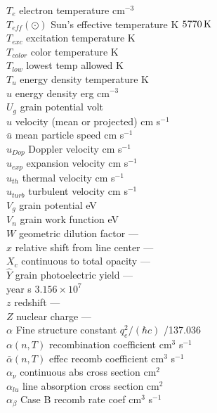 \begin{tabbing}
$T_e$ \>  electron temperature \>
cm$^{-3}$\\
$T_{eff}(\odot)$ \>  Sun's effective temperature \>  K \>  $5770 {\rm\thinspace K}$\\
$T_{exc}$ \>  excitation
temperature \>  K \> \\
$T_{color}$ \>  color temperature \>  K\\
$T_{low}$ \>  lowest temp allowed \>  K \>   \TEMPLIMITLOW\\
$T_{u}$ \>  energy density temperature \>  K\\
$u$ \>  energy density \>  erg cm$^{-3}$\\
$U_g$ \>  grain
potential \>  volt\\
$u$ \>  velocity (mean or projected) \>  cm s$^{-1}$\\
$\bar u$ \>  mean particle speed \>  cm s$^{-1}$\\
$u_{Dop}$ \>  Doppler velocity \>  cm s$^{-1}$\\
$u_{exp}$ \>  expansion
velocity \>  cm s$^{-1}$\\
$u_{th}$ \>  thermal velocity \>  cm s$^{-1}$\\
$u_{turb}$ \>  turbulent velocity \>  cm s$^{-1}$\\
$V_g$ \>  grain potential \>  eV\\
$V_n$ \>  grain work function \>  eV\\
$W$ \>  geometric dilution factor \> ---\\
$x$ \>  relative shift from line center \> ---\\
$X_c$ \>  continuous to total opacity \> ---\\
$\hat Y$ \>
grain photoelectric yield \> ---\\
year \>  \>  s \>  $3.156\times 10^7$\\
$z$ \>  redshift \> ---\\
$Z$ \> nuclear
charge \> ---\\
$\alpha$ \>  Fine structure constant \>  $q_e^2/( {\hbar c} )$ /137.036\\
$\alpha(n, T)$ \>  recombination coefficient \>  cm$^3$ s$^{-1}$\\
$ \bar \alpha (n,T)$ \>
effec recomb coefficient \>  cm$^3$ s$^{-1}$\\
$\alpha_\nu$ \>  continuous abs cross section \>
cm$^2$\\
$\alpha_{lu}$ \>   line absorption cross section \>  cm$^2$\\
$\alpha_\beta$ \>  Case B recomb rate coef \>  cm$^3$
s$^{-1}$\\

\end{tabbing}
